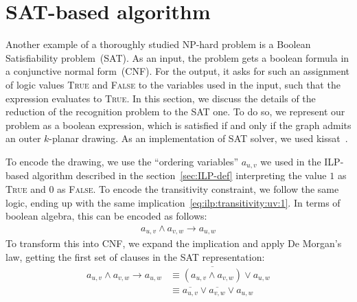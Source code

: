 \section{SAT-based algorithm}\label{sec:SAT-def}

Another example of a thoroughly studied NP-hard problem is a Boolean Satisfiability problem~(SAT). As an input, the problem gets a boolean formula in a conjunctive normal form~(CNF). For the output, it asks for such an assignment of logic values \textsc{True} and \textsc{False} to the variables used in the input, such that the expression evaluates to \textsc{True}. In this section, we discuss the details of the reduction of the recognition problem to the SAT one. To do so, we represent our problem as a boolean expression, which is satisfied if and only if the graph admits an outer \(k\)-planar drawing. As an implementation of SAT solver, we used kissat~\cite{kissat, kissat-library}.

To encode the drawing, we use the ``ordering variables'' \(a_{u, v}\) we used in the ILP-based algorithm described in the section~\ref{sec:ILP-def} interpreting the value \(1\) as \textsc{True} and \(0\) as \textsc{False}. To encode the transitivity constraint, we follow the same logic, ending up with the same implication~\eqref{eq:ilp:transitivity:uv:1}. In terms of boolean algebra, this can be encoded as follows:
\begin{align*}
    a_{u, v} \land a_{v, w} \rightarrow a_{u, w}
\end{align*}
To transform this into CNF, we expand the implication and apply De Morgan's law, getting the first set of clauses in the SAT representation:
\begin{align}
    a_{u, v} \land a_{v, w} \rightarrow a_{u, w}
    &\equiv \overline{(a_{u, v} \land a_{v, w})} \lor a_{u, w} \nonumber \\
    &\equiv \overline{a_{u, v}} \lor \overline{a_{v, w}} \lor a_{u, w} \label{sat:trans}
\end{align}

